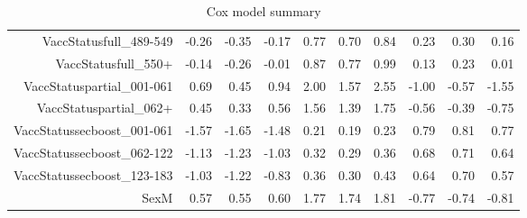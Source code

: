 \begin{table}[ht]
\begin{tabular}{rrrrrrrrrr}
  VaccStatusfull\_489-549 & -0.26 & -0.35 & -0.17 & 0.77 & 0.70 & 0.84 & 0.23 & 0.30 & 0.16 \\ 
  VaccStatusfull\_550+ & -0.14 & -0.26 & -0.01 & 0.87 & 0.77 & 0.99 & 0.13 & 0.23 & 0.01 \\ 
  VaccStatuspartial\_001-061 & 0.69 & 0.45 & 0.94 & 2.00 & 1.57 & 2.55 & -1.00 & -0.57 & -1.55 \\ 
  VaccStatuspartial\_062+ & 0.45 & 0.33 & 0.56 & 1.56 & 1.39 & 1.75 & -0.56 & -0.39 & -0.75 \\ 
  VaccStatussecboost\_001-061 & -1.57 & -1.65 & -1.48 & 0.21 & 0.19 & 0.23 & 0.79 & 0.81 & 0.77 \\ 
  VaccStatussecboost\_062-122 & -1.13 & -1.23 & -1.03 & 0.32 & 0.29 & 0.36 & 0.68 & 0.71 & 0.64 \\ 
  VaccStatussecboost\_123-183 & -1.03 & -1.22 & -0.83 & 0.36 & 0.30 & 0.43 & 0.64 & 0.70 & 0.57 \\ 
  SexM & 0.57 & 0.55 & 0.60 & 1.77 & 1.74 & 1.81 & -0.77 & -0.74 & -0.81 \\ 
   \hline
\end{tabular}
\caption{Cox model summary} 
\end{table}
